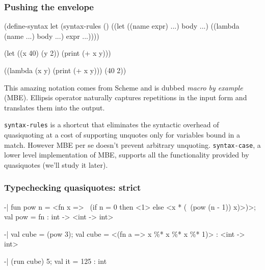 \documentclass[hyperref={bookmarks=false}]{beamer}
\begin{document}
\begin{frame}[fragile]
\frametitle{Pushing the envelope}

\begin{lstlistinglike}
\begin{semiverbatim}
(define-syntax let
  (syntax-rules ()
    ((let ((name expr) ...) body ...)
     ((lambda (name ...) body ...) expr ...))))

(let ((x 40) (y 2)) (print (+ x y)))

((lambda (x y) (print (+ x y))) (40 2))
\end{semiverbatim}
\end{lstlistinglike}

This amazing notation comes from Scheme and is dubbed \emph{macro by example} (MBE).
Ellipsis operator naturally captures repetitions in the input form
and translates them into the output.

\texttt{syntax-rules} is a shortcut that eliminates the syntactic overhead of quasiquoting at a cost
of supporting unquotes only for variables bound in a match. However MBE per se doesn't prevent
arbitrary unquoting. \texttt{syntax-case}, a lower level implementation of MBE, supports all the
functionality provided by quasiquotes (we'll study it later).
\end{frame}

\begin{frame}[fragile]
\frametitle{Typechecking quasiquotes: strict}

\begin{lstlistinglike}
\begin{semiverbatim}
-| fun pow n = <fn x =>
    ~(if n = 0 then <1> else <x * (~(pow (n - 1)) x)>)>;
val pow = fn : int -> <int -> int>

-| val cube = (pow 3);
val cube = <(fn a => x \%* x \%* x \%* 1)> : <int -> int>

-| (run cube) 5;
val it = 125 : int
\end{semiverbatim}
\end{lstlistinglike}


\end{frame}
\end{document}
